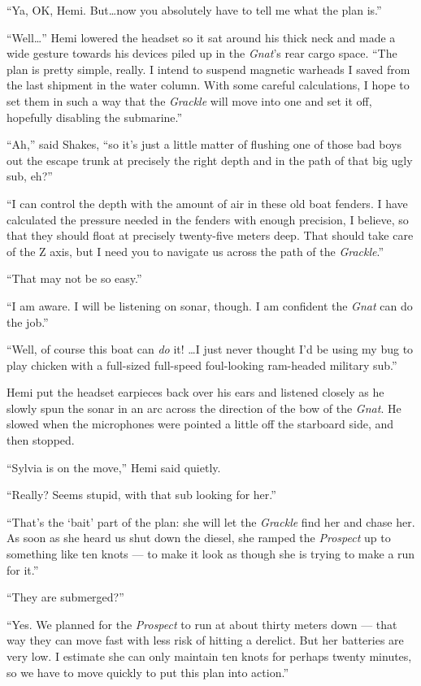 \documentclass[
]{scrbook}
\begin{document}
``Ya, OK, Hemi. But\ldots now you absolutely have to tell me what the
plan is.''

``Well\ldots{}'' Hemi lowered the headset so it sat around his thick
neck and made a wide gesture towards his devices piled up in the
\emph{Gnat}'s rear cargo space. ``The plan is pretty simple, really. I
intend to suspend magnetic warheads I saved from the last shipment in
the water column. With some careful calculations, I hope to set them in
such a way that the \emph{Grackle} will move into one and set it off,
hopefully disabling the submarine.''

``Ah,'' said Shakes, ``so it's just a little matter of flushing one of
those bad boys out the escape trunk at precisely the right depth and in
the path of that big ugly sub, eh?''

``I can control the depth with the amount of air in these old boat
fenders. I have calculated the pressure needed in the fenders with
enough precision, I believe, so that they should float at precisely
twenty-five meters deep. That should take care of the Z axis, but I need
you to navigate us across the path of the \emph{Grackle}.''

``That may not be so easy.''

``I am aware. I will be listening on sonar, though. I am confident the
\emph{Gnat} can do the job.''

``Well, of course this boat can \emph{do} it! \ldots I just never
thought I'd be using my bug to play chicken with a full-sized full-speed
foul-looking ram-headed military sub.''

Hemi put the headset earpieces back over his ears and listened closely
as he slowly spun the sonar in an arc across the direction of the bow of
the \emph{Gnat}. He slowed when the microphones were pointed a little
off the starboard side, and then stopped.

``Sylvia is on the move,'' Hemi said quietly.

``Really? Seems stupid, with that sub looking for her.''

``That's the `bait' part of the plan: she will let the \emph{Grackle}
find her and chase her. As soon as she heard us shut down the diesel,
she ramped the \emph{Prospect} up to something like ten knots --- to
make it look as though she is trying to make a run for it.''

``They are submerged?''

``Yes. We planned for the \emph{Prospect} to run at about thirty meters
down --- that way they can move fast with less risk of hitting a
derelict. But her batteries are very low. I estimate she can only
maintain ten knots for perhaps twenty minutes, so we have to move
quickly to put this plan into action.''
\end{document}
